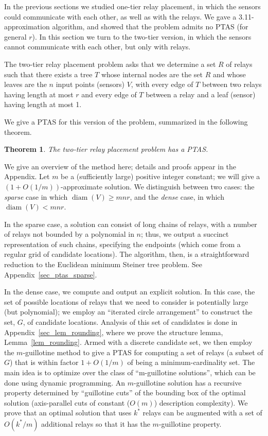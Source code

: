 \documentclass[11pt,a4paper]{article}
\DeclareMathOperator{\diam}{diam}
\newtheorem{theorem}{Theorem}
\theoremstyle{definition}
\theoremstyle{remark}
\begin{document}
In the previous sections we studied one-tier relay placement, in which
the sensors could communicate with each other, as well as with the
relays.  We gave a 3.11-approximation algorithm, and showed that the
problem admits no PTAS (for general $r$).  In this section we turn to
the two-tier version, in which the sensors cannot communicate with
each other, but only with relays.

The two-tier relay placement problem asks that we determine a set $R$
of relays such that there exists a tree $T$ whose internal nodes are
the set $R$ and whose leaves are the $n$ input points (sensors) $V$,
with every edge of $T$ between two relays having length at most $r$
and every edge of $T$ between a relay and a leaf (sensor) having
length at most 1.

We give a PTAS for this version of the problem, summarized in the
following theorem.

\begin{theorem}\label{thm:ptas}
The two-tier relay placement problem has a PTAS.
\end{theorem}

We give an overview of the method here; details and proofs appear in
the Appendix. Let $m$ be a (sufficiently large) positive integer constant; we will give a $(1+O(1/m))$-approximate solution. We distinguish between two cases: the \emph{sparse} case in which $\diam(V) \ge mnr$,
and the \emph{dense} case, in which $\diam(V) < mnr$.

In the sparse case, a solution can consist of long chains of relays,
with a number of relays not bounded by a polynomial in $n$; thus, we
output a succinct representation of such chains, specifying the
endpoints (which come from a regular grid of candidate locations).
The algorithm, then, is a straightforward reduction to the Euclidean
minimum Steiner tree problem.  See Appendix~\ref{sec_ptas_sparse}.

In the dense case, we compute and output an explicit solution.  In
this case, the set of possible locations of relays that we need to
consider is potentially large (but polynomial); we employ an
``iterated circle arrangement'' to construct the set, $G$, of
candidate locations.  Analysis of this set of candidates is done in
Appendix~\ref{sec_lem_rounding}, where we prove the structure lemma,
Lemma~\ref{lem_rounding}.  Armed with a discrete candidate set, we
then employ the $m$-guillotine method \cite{mitchell99guillotine} to
give a PTAS for computing a set of relays (a subset of $G$) that is
within factor $1+O(1/m)$ of being a minimum-cardinality set.  
The main idea is to optimize over the class of ``m-guillotine solutions'', which can be done using dynamic programming. An $m$-guillotine solution has a recursive property determined by ``guillotine cuts'' of the bounding box of the optimal solution (axis-parallel cuts of constant ($O(m)$) description complexity). We prove that an optimal solution that uses $k^*$ relays can be augmented with a set of $O(k^*/m)$ additional relays so that it has the $m$-guillotine property.
\end{document}
